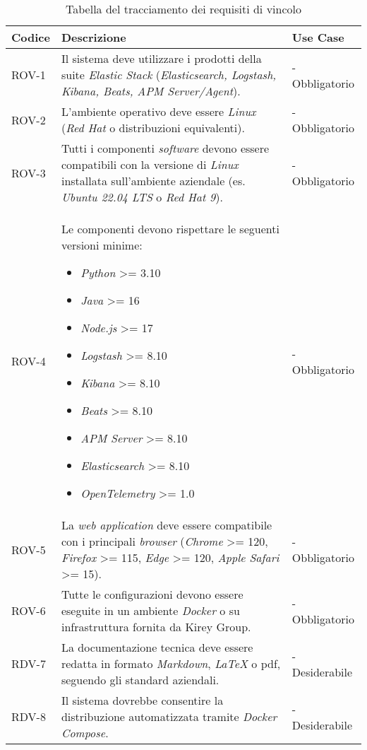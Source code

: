 \begin{table}[H]
\caption{Tabella del tracciamento dei requisiti di vincolo}
\label{tab:requisiti-vincolo}
\begin{tabularx}{\textwidth}{lXl}
\hline
\rowcolor[gray]{0.8}
\textbf{Codice} & \textbf{Descrizione} & \textbf{Use Case}\\
\hline
ROV-1    & Il sistema deve utilizzare i prodotti della suite \emph{Elastic Stack} (\emph{Elasticsearch, Logstash, Kibana, Beats, APM Server/Agent}). & - Obbligatorio \\
\hline

\hline
ROV-2    & L'ambiente operativo deve essere \emph{Linux} (\emph{Red Hat} o distribuzioni equivalenti). & - Obbligatorio \\
\hline

\hline
ROV-3    & Tutti i componenti \emph{software} devono essere compatibili con la versione di \emph{Linux} installata sull'ambiente aziendale (es. \emph{Ubuntu 22.04 LTS} o \emph{Red Hat 9}). & - Obbligatorio \\
\hline

\hline
ROV-4    & Le componenti devono rispettare le seguenti versioni minime:

\begin{itemize}
    \item \emph{Python} >= 3.10
    \item \emph{Java} >= 16
    \item \emph{Node.js} >= 17
    \item \emph{Logstash} >= 8.10
    \item \emph{Kibana} >= 8.10
    \item \emph{Beats} >= 8.10
    \item \emph{APM Server} >= 8.10
    \item \emph{Elasticsearch} >= 8.10
    \item \emph{OpenTelemetry} >= 1.0
\end{itemize}& - Obbligatorio \\
\hline

\hline
ROV-5    & La \emph{web application} deve essere compatibile con i principali \emph{browser} (\emph{Chrome} >= 120, \emph{Firefox} >= 115, \emph{Edge} >= 120, \emph{Apple Safari} >= 15). & - Obbligatorio \\
\hline

\hline
ROV-6    & Tutte le configurazioni devono essere eseguite in un ambiente \emph{Docker} o su infrastruttura fornita da Kirey Group. & - Obbligatorio \\
\hline

\hline
RDV-7    & La documentazione tecnica deve essere redatta in formato \emph{Markdown}, \emph{LaTeX} o \gls{pdf}, seguendo gli standard aziendali. & - Desiderabile \\
\hline

\hline
RDV-8    & Il sistema dovrebbe consentire la distribuzione automatizzata tramite \emph{Docker Compose}. & - Desiderabile \\
\hline

\end{tabularx}
\end{table}


